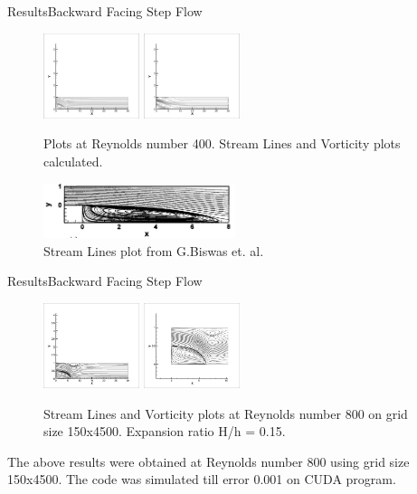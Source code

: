 \documentclass[11pt]{beamer}
\begin{document}
\begin{frame}{Results}{Backward Facing Step Flow}
\begin{figure}[hH]
\includegraphics[width=0.25\textwidth]{figures/l30l/400psi}
\includegraphics[width=0.25\textwidth]{figures/l30l/400omega}
\caption{Plots at Reynolds number 400. Stream Lines and Vorticity plots calculated.}
\end{figure}
\begin{figure}[hH]
\includegraphics[width=0.5\textwidth]{figures/sir/re400psi}
\caption{Stream Lines plot from G.Biswas et. al.}
\end{figure}
\end{frame}

\begin{frame}{Results}{Backward Facing Step Flow}
\begin{figure}[hH]
\includegraphics[width=0.25\textwidth]{figures/cuda/psi}
\includegraphics[width=0.25\textwidth]{figures/cuda/psizoom}
\caption{Stream Lines and Vorticity plots at Reynolds number 800 on grid size 150x4500. Expansion ratio H/h = 0.15.}
\end{figure}
The above results were obtained at Reynolds number 800 using grid size
150x4500. The code was simulated till error 0.001 on CUDA program.
\end{frame}
\end{document}
